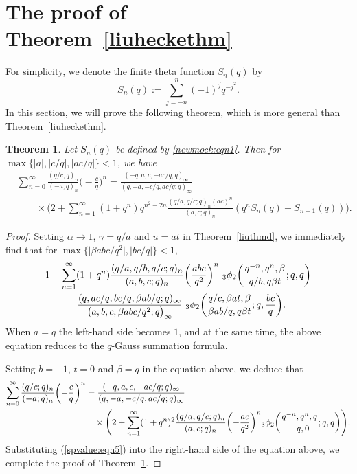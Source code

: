 \documentclass[pdftex]{sigma}
\numberwithin{equation}{section}
\newtheorem{Theorem}{Theorem}[section]
\begin{document}
\section{The proof of Theorem~\ref{liuheckethm}}\label{sec7}

For simplicity, we denote the finite theta function $S_n(q)$ by
\begin{equation}\label{newmock:eqn1}
S_n(q):=\sum_{j=-n}^n (-1)^j q^{-j^2}.
\end{equation}
In this section, we will prove the following theorem, which is more general than Theorem~\ref{liuheckethm}.
\begin{Theorem} \label{andmockthm}
Let $S_n(q)$ be defined by \eqref{newmock:eqn1}. Then for $\max \{|a|, |c/q|, |ac/q|\}<1 $, we have
\begin{align*}%
&\sum_{n=0}^\infty \frac{(q/c; q)_n}{(-a; q)_n} \biggl(-\frac{c}{q}\biggr)^n
=\frac{(-q, a, c, -ac/q; q)_\infty}{(q, -a, -c/q, ac/q; q)_\infty}\\
	&\qquad{} \times \Biggl(2+\sum_{n=1}^\infty (1+q^n)q^{n^2-2n}\frac{(q/a, q/c; q)_n (ac)^n}{(a, c; q)_n}(q^n S_n(q)-S_{n-1}(q)) \Biggr).\nonumber
\end{align*}
\end{Theorem}
\begin{proof}
	Setting $\alpha \to 1$, $\gamma=q/a$ and $u=at$ in Theorem~\ref{liuthmd}, we immediately find that for $\max\bigl\{\bigl|\beta abc/q^2\bigr|, \bigl|bc/q\bigr|\bigr\}<1,$
	\begin{align}
		&1+\sum_{n=1}^\infty (1+q^n) \frac{(q/a, q/b, q/c; q)_n}{(a, b, c; q)_n} \biggl(\frac{abc}{q^2}\biggr)^n~{_3\phi_2}\biggl({{q^{-n}, q^n, \beta}\atop{q/b, q\beta t}}; q, q\biggr)\nonumber\\
		&\qquad{}=\frac{(q, ac/q, bc/q, \beta ab/q; q)_\infty}{\bigl(a, b, c, \beta abc/q^2; q\bigr)_\infty}~
		{_3\phi_2}\biggl({{q/c, \beta at, \beta}\atop{\beta ab/q, q\beta t}}; q, \frac{bc}{q}\biggr).\label{newmock:eqn3}
	\end{align}	
 When $a=q$ the left-hand side becomes $1$, and at the same time, the above equation reduces to the $q$-Gauss summation formula.

	Setting $b=-1$, $t=0$ and $\beta=q$ in the equation above, we deduce that
	\begin{align*}%
\sum_{n=0}^\infty \frac{(q/c; q)_n}{(-a; q)_n} \biggl(-\frac{c}{q}\biggr)^n
		&{}=\frac{(-q, a, c, -ac/q; q)_\infty}{(q, -a, -c/q, ac/q; q)_\infty}\\
		&\quad{} \times \Biggl(2+\sum_{n=1}^\infty (1+q^n)^2 \frac{(q/a, q/c; q)_n}{(a, c; q)_n}
		\biggl(-\frac{ac}{q^2}\biggr)^n {_3\phi_2}\biggl({{q^{-n}, q^n, q}\atop{-q, 0}}; q, q\biggr)\Biggr).\nonumber
	\end{align*}	
	 Substituting (\ref{spvalue:eqn5}) into the right-hand side of the equation above, we complete the proof of Theorem~\ref{andmockthm}.
\end{proof}
\end{document}
